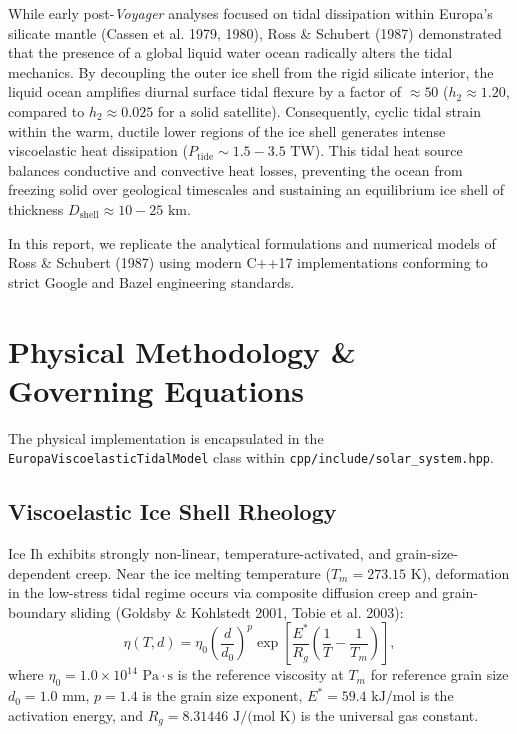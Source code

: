 \documentclass[11pt,a4paper]{article}
\begin{document}
While early post-\textit{Voyager} analyses focused on tidal dissipation within Europa's silicate mantle (Cassen et al. 1979, 1980), Ross \& Schubert (1987) demonstrated that the presence of a global liquid water ocean radically alters the tidal mechanics. By decoupling the outer ice shell from the rigid silicate interior, the liquid ocean amplifies diurnal surface tidal flexure by a factor of $\approx 50$ ($h_2 \approx 1.20$, compared to $h_2 \approx 0.025$ for a solid satellite). Consequently, cyclic tidal strain within the warm, ductile lower regions of the ice shell generates intense viscoelastic heat dissipation ($P_{\mathrm{tide}} \sim 1.5 - 3.5\text{ TW}$). This tidal heat source balances conductive and convective heat losses, preventing the ocean from freezing solid over geological timescales and sustaining an equilibrium ice shell of thickness $D_{\mathrm{shell}} \approx 10 - 25\text{ km}$.

In this report, we replicate the analytical formulations and numerical models of Ross \& Schubert (1987) using modern C++17 implementations conforming to strict Google and Bazel engineering standards.

\section{Physical Methodology \& Governing Equations}
The physical implementation is encapsulated in the \texttt{EuropaViscoelasticTidalModel} class within \texttt{cpp/include/solar\_system.hpp}.

\subsection{Viscoelastic Ice Shell Rheology}
Ice Ih exhibits strongly non-linear, temperature-activated, and grain-size-dependent creep. Near the ice melting temperature ($T_m = 273.15\text{ K}$), deformation in the low-stress tidal regime occurs via composite diffusion creep and grain-boundary sliding (Goldsby \& Kohlstedt 2001, Tobie et al. 2003):
\begin{equation}
\eta(T, d) = \eta_0 \left(\frac{d}{d_0}\right)^p \exp\left[\frac{E^*}{R_g}\left(\frac{1}{T} - \frac{1}{T_m}\right)\right],
\label{eq:viscosity}
\end{equation}
where $\eta_0 = 1.0 \times 10^{14}\text{ Pa}\cdot\text{s}$ is the reference viscosity at $T_m$ for reference grain size $d_0 = 1.0\text{ mm}$, $p = 1.4$ is the grain size exponent, $E^* = 59.4\text{ kJ/mol}$ is the activation energy, and $R_g = 8.31446\text{ J/(mol K)}$ is the universal gas constant.
\end{document}
